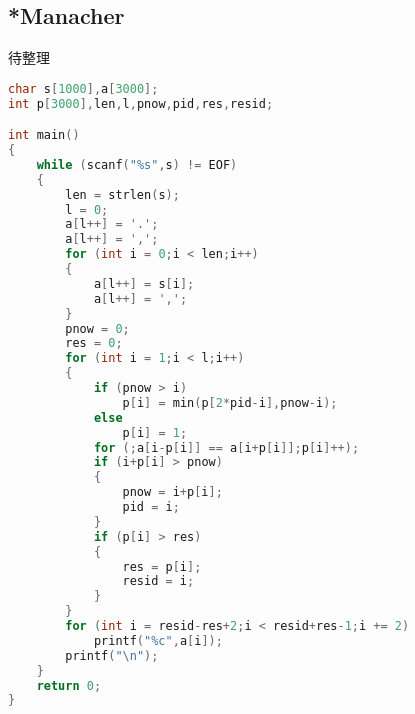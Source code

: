 \subsection{*Manacher}
	待整理
	\begin{lstlisting}[language=c++]
char s[1000],a[3000];
int p[3000],len,l,pnow,pid,res,resid;

int main()
{
	while (scanf("%s",s) != EOF)
	{
		len = strlen(s);
		l = 0;
		a[l++] = '.';
		a[l++] = ',';
		for (int i = 0;i < len;i++)
		{
			a[l++] = s[i];
			a[l++] = ',';
		}
		pnow = 0;
		res = 0;
		for (int i = 1;i < l;i++)
		{
			if (pnow > i)
				p[i] = min(p[2*pid-i],pnow-i);
			else
				p[i] = 1;
			for (;a[i-p[i]] == a[i+p[i]];p[i]++);
			if (i+p[i] > pnow)
			{
				pnow = i+p[i];
				pid = i;
			}
			if (p[i] > res)
			{
				res = p[i];
				resid = i;
			}
		}
		for (int i = resid-res+2;i < resid+res-1;i += 2)
			printf("%c",a[i]);
		printf("\n");
	}
	return 0;
}
	\end{lstlisting}